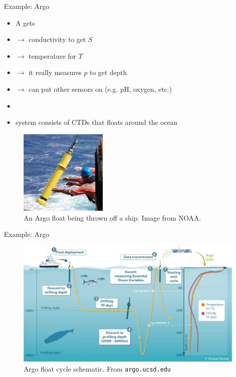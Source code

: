 \documentclass[xcolor=x11names,compress]{beamer}
\renewcommand{\(}{\begin{columns}}
\renewcommand{\)}{\end{columns}}
\newcommand{\<}[1]{\begin{column}{#1}}
\renewcommand{\>}{\end{column}}
\begin{document}

\begin{frame}{Example: Argo}

\parbox{0.55\textwidth}{
\begin{itemize}
  \item A  gets
  \item[] $\to$ conductivity to get $S$
  \item[] $\to$ temperature for $T$
  \item[] $\to$ it really measures $p$ to get depth
  \item[] $\to$ can put other sensors on (e.g. pH, oxygen, etc.)
  \item[]
  \item {} system consists of CTDs that floats around the ocean
\end{itemize}
}\hspace*{3mm}\parbox{0.38\textwidth}{
\begin{figure}
  \includegraphics[width=0.38\textwidth]{argo_float}
  \caption{An Argo float being thrown off a ship. Image from NOAA.}
\end{figure}
}

\end{frame}


\begin{frame}{Example: Argo}

\begin{figure}
  \includegraphics[width=\textwidth]{float_cycle_1}
  \caption{Argo float cycle schematic. From \texttt{argo.ucsd.edu}}
\end{figure}

\end{frame}
\end{document}
